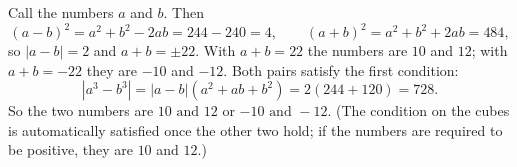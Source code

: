 Call the numbers $a$ and $b$. Then
\[(a-b)^2=a^2+b^2-2ab=244-240=4,\qquad (a+b)^2=a^2+b^2+2ab=484,\]
so $|a-b|=2$ and $a+b=\pm22$. With $a+b=22$ the numbers are $10$ and $12$; with $a+b=-22$ they are $-10$ and $-12$. Both pairs satisfy the first condition:
\[\left|a^3-b^3\right|=|a-b|\left(a^2+ab+b^2\right)=2(244+120)=728 .\]
So the two numbers are $\boxed{10\text{ and }12}$ or $\boxed{-10\text{ and }-12}$. (The condition on the cubes is automatically satisfied once the other two hold; if the numbers are required to be positive, they are $10$ and $12$.)
